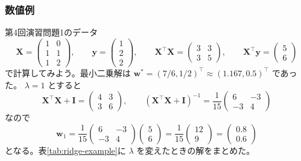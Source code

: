\subsubsection{数値例}

第4回演習問題1のデータ
\begin{equation*}
  \bm{X} = \begin{pmatrix} 1 & 0 \\ 1 & 1 \\ 1 & 2 \end{pmatrix}, \qquad
  \bm{y} = \begin{pmatrix} 1 \\ 2 \\ 2 \end{pmatrix}, \qquad
  \bm{X}^\top\bm{X} = \begin{pmatrix} 3 & 3 \\ 3 & 5 \end{pmatrix}, \qquad
  \bm{X}^\top\bm{y} = \begin{pmatrix} 5 \\ 6 \end{pmatrix}
\end{equation*}
で計算してみよう。最小二乗解は $\bm{w}^* = (7/6, 1/2)^\top \approx (1.167, 0.5)^\top$ であった。
$\lambda = 1$ とすると
\begin{equation*}
  \bm{X}^\top\bm{X} + \bm{I} = \begin{pmatrix} 4 & 3 \\ 3 & 6 \end{pmatrix}, \qquad
  (\bm{X}^\top\bm{X} + \bm{I})^{-1} = \frac{1}{15}\begin{pmatrix} 6 & -3 \\ -3 & 4 \end{pmatrix}
\end{equation*}
なので
\begin{equation*}
  \bm{w}_1 = \frac{1}{15}\begin{pmatrix} 6 & -3 \\ -3 & 4 \end{pmatrix}\begin{pmatrix} 5 \\ 6 \end{pmatrix}
  = \frac{1}{15}\begin{pmatrix} 12 \\ 9 \end{pmatrix}
  = \begin{pmatrix} 0.8 \\ 0.6 \end{pmatrix}
\end{equation*}
となる。表\ref{tab:ridge-example}に $\lambda$ を変えたときの解をまとめた。

